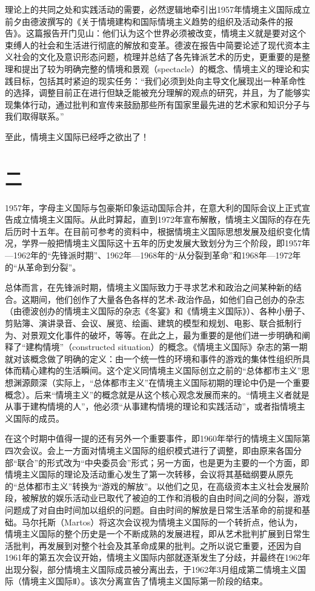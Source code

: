 \documentclass[fontset=fandol, a4paper, 12pt, openright]{ctexbook}
\begin{document}
理论上的共同之处和实践活动的需要，必然逻辑地牵引出1957年情境主义国际成立前夕由德波撰写的《关于情境建构和国际情境主义趋势的组织及活动条件的报告》。这篇报告开门见山：他们认为这个世界必须被改变，情境主义就是要对这个束缚人的社会和生活进行彻底的解放和变革。德波在报告中简要论述了现代资本主义社会的文化及意识形态问题，梳理并总结了各先锋派艺术的历史，更重要的是整理和提出了较为明确完整的情境和景观（spectacle）的概念、情境主义的理论和实践目标，包括其时紧迫的现实任务：“我们必须到处向主导文化展现出一种革命性的选择，调整目前正在进行但缺乏能被充分理解的观点的研究，并且，为了能够实现集体行动，通过批判和宣传来鼓励那些所有国家里最先进的艺术家和知识分子与我们取得联系。”

至此，情境主义国际已经呼之欲出了！

\section*{二}

1957年，字母主义国际与包豪斯印象运动国际合并，在意大利的国际会议上正式宣告成立情境主义国际。从此时算起，直到1972年宣布解散，情境主义国际的存在先后历时十五年。在目前可参考的资料中，根据情境主义国际思想发展及组织变化情况，学界一般把情境主义国际这十五年的历史发展大致划分为三个阶段，即1957年—1962年的“先锋派时期”、1962年—1968年的“从分裂到革命”和1968年—1972年的“从革命到分裂”。

总体而言，在先锋派时期，情境主义国际致力于寻求艺术和政治之间某种新的结合。这期间，他们创作了大量各色各样的艺术-政治作品，如他们自己创办的杂志（由德波创办的情境主义国际的杂志《冬宴》和《情境主义国际》）、各种小册子、剪贴簿、演讲录音、会议、展览、绘画、建筑的模型和规划、电影、联合抵制行为、对景观文化事件的破坏，等等。在此之上，最为重要的是他们进一步明确和阐释了“建构情境”（constructed situation）的概念。《情境主义国际》杂志的第一期就对该概念做了明确的定义：由一个统一性的环境和事件的游戏的集体性组织所具体而精心建构的生活瞬间。这个定义同情境主义国际创立之前的“总体都市主义”思想渊源颇深（实际上，“总体都市主义”在情境主义国际初期的理论中仍是一个重要概念）。后来“情境主义”的概念就是从这个核心观念发展而来的。“情境主义者就是从事于建构情境的人”，他必须“从事建构情境的理论和实践活动”，或者指情境主义国际的成员。

在这个时期中值得一提的还有另外一个重要事件，即1960年举行的情境主义国际第四次会议。会上一方面对情境主义国际的组织模式进行了调整，即由原来各国分部“联合”的形式改为“中央委员会”形式；另一方面，也是更为主要的一个方面，即情境主义国际的理论及活动重心发生了第一次转移，会议将其基础纲要从原先的“总体都市主义”转换为“游戏的解放”。以他们之见，在高级资本主义社会发展阶段，被解放的娱乐活动业已取代了被迫的工作和消极的自由时间之间的分裂，游戏问题成了对自由时间加以组织的问题。自由时间的解放是日常生活革命的前提和基础。马尔托斯（Martos）将这次会议视为情境主义国际的一个转折点，他认为，情境主义国际的整个历史是一个不断成熟的发展进程，即从艺术批判扩展到日常生活批判，再发展到对整个社会及其革命成果的批判。之所以说它重要，还因为自1961年的第五次会议开始，情境主义国际内部就逐渐发生了分歧，并最终在1962年出现分裂，部分情境主义国际成员被分离出去，于1962年3月组成第二情境主义国际（情境主义国际Ⅱ）。该次分离宣告了情境主义国际第一阶段的结束。
\end{document}
